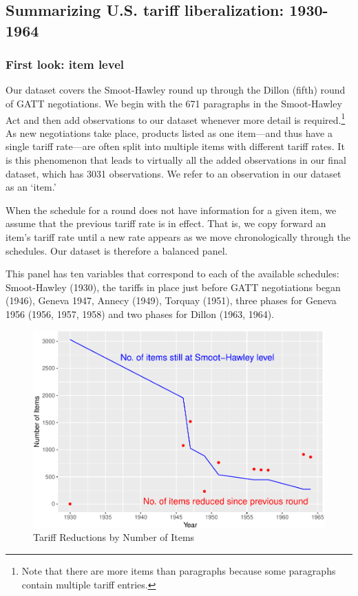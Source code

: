 \documentclass[
  12pt,
]{article}
\begin{document}
\hypertarget{summarizing-u.s.-tariff-liberalization-1930-1964}{%
\subsection{Summarizing U.S. tariff liberalization: 1930-1964}\label{summarizing-u.s.-tariff-liberalization-1930-1964}}

\hypertarget{first-look-item-level}{%
\subsubsection{First look: item level}\label{first-look-item-level}}

Our dataset covers the Smoot-Hawley round up through the Dillon (fifth) round of GATT negotiations. We begin with the 671 paragraphs in the Smoot-Hawley Act and then add observations to our dataset whenever more detail is required.\footnote{Note that there are more items than paragraphs because some paragraphs contain multiple tariff entries.} As new negotiations take place, products listed as one item---and thus have a single tariff rate---are often split into multiple items with different tariff rates. It is this phenomenon that leads to virtually all the added observations in our final dataset, which has 3031 observations. We refer to an observation in our dataset as an `item.'

When the schedule for a round does not have information for a given item, we assume that the previous tariff rate is in effect. That is, we copy forward an item's tariff rate until a new rate appears as we move chronologically through the schedules. Our dataset is therefore a balanced panel.

This panel has ten variables that correspond to each of the available schedules: Smoot-Hawley (1930), the tariffs in place just before GATT negotiations began (1946), Geneva 1947, Annecy (1949), Torquay (1951), three phases for Geneva 1956 (1956, 1957, 1958) and two phases for Dillon (1963, 1964).

\begin{figure}[!h]
\includegraphics{data-paper_files/figure-latex/ibi-1} \caption{Tariff Reductions by Number of Items}\label{fig:ibi}
\end{figure}
\end{document}
